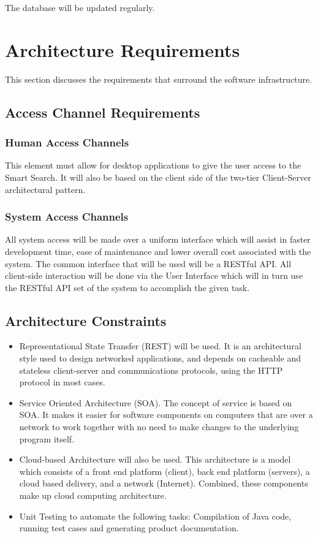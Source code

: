 \documentclass[a4paper,10pt]{article}
\begin{document}
	The database will be updated regularly.

	\newpage
	\section{Architecture Requirements}
	This section discusses the requirements that surround the software infrastructure.

	\subsection{Access Channel Requirements}
		\subsubsection{Human Access Channels}
	This element must allow for desktop applications to give the user access to the Smart Search.
	It will also be based on the client side of the two-tier Client-Server architectural pattern.

		\subsubsection{System Access Channels}
	All system access will be made over a uniform interface which will assist in faster development time, ease of maintenance and 		lower overall cost associated with the system. The common interface that will be used will be a RESTful API. All client-side 		interaction will be done via the User Interface which will in turn use the RESTful API set of the system to accomplish the given 	task.
	
	\subsection{Architecture Constraints}
	\begin{itemize}
		\item Representational State Transfer (REST) will be used. It is an architectural style used to design networked 	applications, and depends on cacheable and stateless client-server and communications protocols, using the HTTP protocol in most cases. 
		\item Service Oriented Architecture (SOA). The concept of service is based on SOA. It makes it easier for software components on computers that are over a network to work together with no need to make changes to the underlying program itself. 
		\item Cloud-based Architecture will also be used. This architecture is a model which consists of a front end platform (client), back end platform (servers), a cloud based delivery, and a network (Internet). Combined, these components make up cloud computing architecture.
		\item Unit Testing to automate the following tasks: Compilation of Java code, running test cases and generating product documentation.
	\end{itemize}
	
\end{document}
